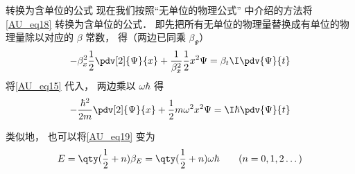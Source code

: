\begin{example}{转换为含单位的公式}
现在我们按照“无单位的物理公式” 中介绍的方法将\autoref{AU_eq18} 转换为含单位的公式． 即先把所有无单位的物理量替换成有单位的物理量除以对应的 $\beta$ 常数， 得（两边已同乘 $\beta_\Psi$）
\begin{equation}
-\beta_x^2\frac12 \pdv[2]{\Psi}{x} + \frac{1}{\beta_x^2}\frac12 x^2 \Psi= \beta_t\I\pdv{\Psi}{t}
\end{equation}
将\autoref{AU_eq15} 代入， 两边乘以 $\omega\hbar$ 得
\begin{equation}
-\frac{\hbar^2}{2m} \pdv[2]{\Psi}{x} + \frac12 m\omega^2 x^2 \Psi= \I\hbar\pdv{\Psi}{t}
\end{equation}

类似地， 也可以将\autoref{AU_eq19} 变为
\begin{equation}
E =  \qty(\frac12 + n)\beta_E = \qty(\frac12 + n)\omega\hbar \qquad (n = 0, 1, 2\dots)
\end{equation}
\end{example}

